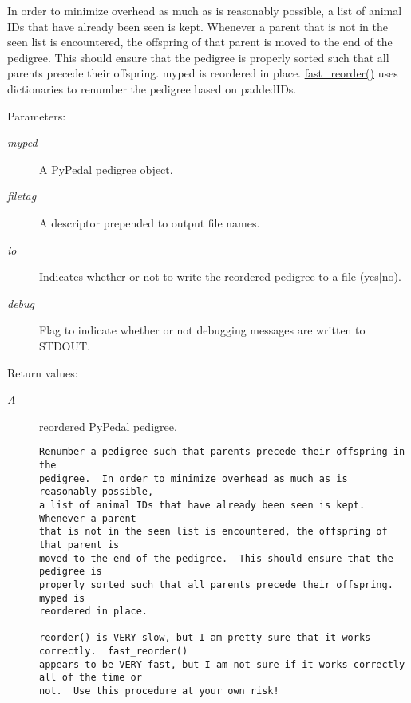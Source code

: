 In order to minimize overhead as much as is reasonably possible, a list of animal IDs that have already been seen is kept. Whenever a parent that is not in the seen list is encountered, the offspring of that parent is moved to the end of the pedigree. This should ensure that the pedigree is properly sorted such that all parents precede their offspring. myped is reordered in place. \hyperlink{namespacePyPedal_1_1pyp__utils_2e16f737b56be8e4ab5ce5103a36644c}{fast\_\-reorder()} uses dictionaries to renumber the pedigree based on padded\-IDs. \begin{Desc}
\item[Parameters:]
\begin{description}
\item[{\em myped}]A Py\-Pedal pedigree object. \item[{\em filetag}]A descriptor prepended to output file names. \item[{\em io}]Indicates whether or not to write the reordered pedigree to a file (yes$|$no). \item[{\em debug}]Flag to indicate whether or not debugging messages are written to STDOUT. \end{description}
\end{Desc}
\begin{Desc}
\item[Return values:]
\begin{description}
\item[{\em A}]reordered Py\-Pedal pedigree.

\footnotesize\begin{verbatim}Renumber a pedigree such that parents precede their offspring in the
pedigree.  In order to minimize overhead as much as is reasonably possible,
a list of animal IDs that have already been seen is kept.  Whenever a parent
that is not in the seen list is encountered, the offspring of that parent is
moved to the end of the pedigree.  This should ensure that the pedigree is
properly sorted such that all parents precede their offspring.  myped is
reordered in place.

reorder() is VERY slow, but I am pretty sure that it works correctly.  fast_reorder()
appears to be VERY fast, but I am not sure if it works correctly all of the time or
not.  Use this procedure at your own risk!
\end{verbatim}
\normalsize
 \end{description}
\end{Desc}


